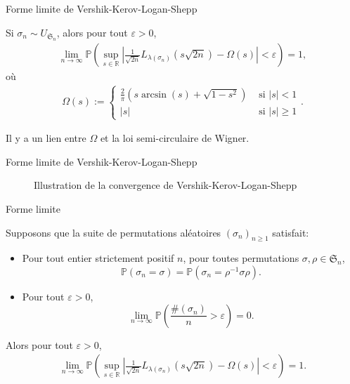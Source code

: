 \documentclass[english]{beamer}
\begin{document}
\begin{frame}{Forme limite de Vershik-Kerov-Logan-Shepp}
    \begin{theorem}
    Si $\sigma_n \sim U_{\mathfrak{S}_n}$, alors pour tout $\varepsilon>0$,
\begin{align*}
\lim_{n\to \infty} \mathbb{P}\left(\sup_{s\in \mathbb{R}} \left|\frac{1}{\sqrt{2n}}L_{\lambda(\sigma_n)}\left({s}{\sqrt{2n}}\right)-\Omega(s)\right|<\varepsilon\right) =1,
\end{align*}
où
\begin{align*}
\Omega(s):=\begin{cases}
\frac{2}{\pi}(s\arcsin({s})+\sqrt{1-s^2}) & \text{ si } |s|<1 \\ 
|s| & \text{ si } |s|\geq 1 
\end{cases}.
\end{align*}
    \end{theorem}
    \vspace{10 mm}

    Il y a un lien entre $\Omega$ et la loi semi-circulaire de Wigner.
\end{frame}
\begin{frame}{Forme limite de Vershik-Kerov-Logan-Shepp}
    \begin{figure}[ht]
    \centering
     \def\svgscale{.65}
    
       

    \caption{Illustration de la convergence de   Vershik-Kerov-Logan-Shepp}
\end{figure}

\end{frame}


 \begin{frame}{Forme limite}
    \begin{theorem}[\cite{sk}]
Supposons que la suite de permutations aléatoires  $(\sigma_n)_{n\geq 1}$ satisfait:
\begin{itemize}
\item  Pour tout entier strictement positif $n$, pour toutes permutations  $\sigma,\rho \in \mathfrak{S}_n$,
\begin{equation*}
\mathbb{P}(\sigma_n=\sigma)=\mathbb{P}(\sigma_n=\rho^{-1}\sigma\rho).
\end{equation*}
\item Pour tout $\varepsilon>0$,
\begin{equation*}
\lim_{n\to \infty}\mathbb{P}\left(\frac{\#(\sigma_n)}{n} >\varepsilon\right) =0.
\end{equation*}
\end{itemize}
Alors pour  tout  $\varepsilon>0$,
\begin{align*}
\lim_{n\to \infty} \mathbb{P}\left(\sup_{s\in \mathbb{R}} \left|\frac{1}{\sqrt{2n}}L_{\lambda(\sigma_n)}\left({s}{\sqrt{2n}}\right)-\Omega(s)\right|<\varepsilon\right) =1.
\end{align*}
\end{theorem}
\end{frame}
\end{document}
